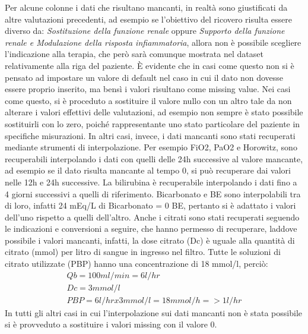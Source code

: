 Per alcune colonne i dati che risultano mancanti, in realtà sono giustificati da altre valutazioni precedenti, ad esempio se l'obiettivo del ricovero risulta essere diverso da: \textit{Sostituzione della funzione renale} oppure \textit{Supporto della funzione renale e Modulazione della risposta infiammatoria}, allora non è possibile scegliere l'indicazione alla terapia, che però sarà comunque mostrata nel dataset relativamente alla riga del paziente. È evidente che in casi come questo non si è pensato ad impostare un valore di default nel caso in cui il dato non dovesse essere proprio inserito, ma bensì i valori risultano come missing value. Nei casi come questo, si è proceduto a sostituire il valore nullo con un altro tale da non alterare i valori effettivi delle valutazioni, ad esempio non sempre è stato possibile sostituirli con lo zero, poiché rappresentante uno stato particolare del paziente in specifiche misurazioni.\newline
In altri casi, invece, i dati mancanti sono stati recuperati mediante strumenti di interpolazione. Per esempio FiO2, PaO2 e Horowitz, sono recuperabili interpolando i dati con quelli delle 24h successive al valore mancante, ad esempio se il dato risulta mancante al tempo 0, si può recuperare dai valori nelle 12h e 24h successive. La bilirubina è recuperabile interpolando i dati fino a 4 giorni successivi a quelli di riferimento.
Bicarbonato e BE sono interpolabili tra di loro, infatti 24 mEq/L di Bicarbonato = 0 BE, pertanto si è adattato i valori dell'uno rispetto a quelli dell'altro.
Anche i citrati sono stati recuperati seguendo le indicazioni e conversioni a seguire, che hanno permesso di recuperare, laddove possibile i valori mancanti, infatti, la dose citrato (Dc) è uguale alla quantità di citrato (mmol) per litro di sangue in ingresso nel filtro. Tutte le soluzioni di citrato utilizzate (PBP) hanno una concentrazione di 18 mmol/l, perciò:
\begin{gather*}
	Qb = 100ml/min = 6l/hr\\
	Dc = 3 mmol/l \\
	PBP= 6 l/hr x 3 mmol/l = 18 mmol/h => 1l/hr
\end{gather*}
In tutti gli altri casi in cui l'interpolazione sui dati mancanti non è stata possibile si è provveduto a sostituire i valori missing con il valore 0.

